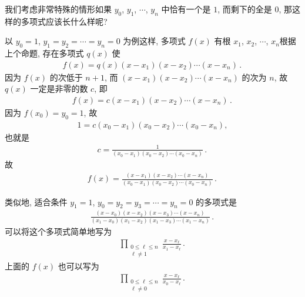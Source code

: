 \begin{example}
    我们考虑非常特殊的情形\period 如果 $y_0$, $y_1$, $\cdots$, $y_n$ 中恰有一个是 $1$, 而剩下的全是 $0$, 那这样的多项式应该长什么样呢?

    以 $y_0 = 1$, $y_1 = y_2 = \cdots = y_n = 0$ 为例\period 这样, 多项式 $f(x)$ 有根 $x_1$, $x_2$, $\cdots$, $x_n$\period 根据上个命题, 存在多项式 $q(x)$ 使
    \begin{align*}
        f(x) = q(x) (x - x_1) (x - x_2) \cdots (x - x_n) \period
    \end{align*}
    因为 $f(x)$ 的次低于 $n+1$, 而 $(x - x_1) (x - x_2) \cdots (x - x_n)$ 的次为 $n$, 故 $q(x)$ 一定是非零的数 $c$, 即
    \begin{align*}
        f(x) = c (x - x_1) (x - x_2) \cdots (x - x_n) \period
    \end{align*}
    因为 $f(x_0) = y_0 = 1$, 故
    \begin{align*}
        1 = c (x_0 - x_1) (x_0 - x_2) \cdots (x_0 - x_n),
    \end{align*}
    也就是
    \begin{align*}
        c = \frac{1}{(x_0 - x_1) (x_0 - x_2) \cdots (x_0 - x_n)} \period
    \end{align*}
    故
    \begin{align*}
        f(x) = \frac{(x - x_1) (x - x_2) \cdots (x - x_n)}{(x_0 - x_1) (x_0 - x_2) \cdots (x_0 - x_n)} \period
    \end{align*}

    类似地, 适合条件 $y_1 = 1$, $y_0 = y_2 = y_3 = \cdots = y_n = 0$ 的多项式是
    \begin{align*}
        \frac{(x - x_0)(x - x_2)(x - x_3) \cdots (x - x_n)}{(x_1 - x_0)(x_1 - x_2)(x_1 - x_3) \cdots (x_1 - x_n)} \period
    \end{align*}
    可以将这个多项式简单地写为
    \begin{align*}
        \prod_{\begin{smallmatrix}0 \leq \ell \leq n \\\ell \neq 1\end{smallmatrix}} \frac{x - x_\ell}{x_1 - x_\ell} \period
    \end{align*}
    上面的 $f(x)$ 也可以写为
    \begin{align*}
        \prod_{\begin{smallmatrix}0 \leq \ell \leq n \\\ell \neq 0\end{smallmatrix}} \frac{x - x_\ell}{x_0 - x_\ell} \period
    \end{align*}
\end{example}

